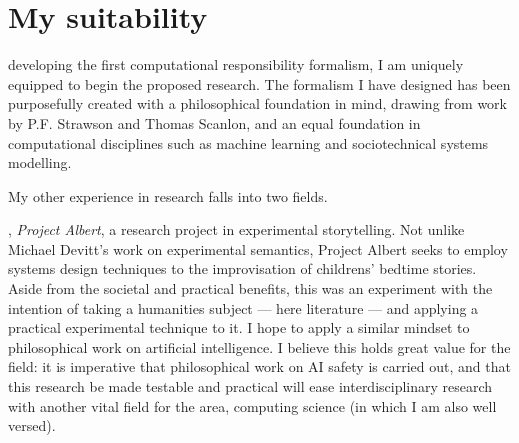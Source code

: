 \section{My suitability}

 developing the first computational responsibility formalism, I am uniquely equipped to begin the proposed research. The formalism I have designed has been purposefully created with a philosophical foundation in mind, drawing from work by P.F. Strawson\cite{freedomandresentment} and Thomas Scanlon\cite{scanlon2006justice}, and an equal foundation in computational disciplines such as machine learning and sociotechnical systems modelling\cite{sommerville_resp_depend}.

My other experience in research falls into two fields.\par

, \emph{Project Albert}, a research project in experimental storytelling. Not unlike Michael Devitt's work on experimental semantics, Project Albert seeks to employ systems design techniques to the improvisation of childrens' bedtime stories. Aside from the societal and practical benefits, this was an experiment with the intention of taking a humanities subject --- here literature --- and applying a practical experimental technique to it. I hope to apply a similar mindset to philosophical work on artificial intelligence. I believe this holds great value for the field: it is imperative that philosophical work on AI safety is carried out, and that this research be made testable and practical will ease interdisciplinary research with another vital field for the area, computing science (in which I am also well versed).\par

